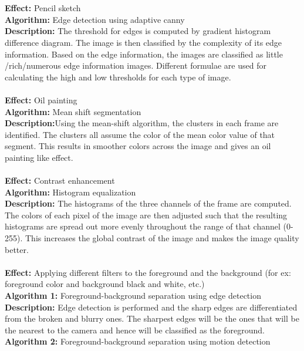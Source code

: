\documentclass{article}
\begin{document}
\\\\
{\bf{Effect:}} Pencil sketch \\
{\bf{Algorithm:}} Edge detection using adaptive canny\\	
{\bf{Description:}} The threshold for edges is computed by gradient histogram difference diagram. The image is then classified by the complexity of its edge information. Based on the edge information, the images are classified as little /rich/numerous edge information images. Different formulae are used for calculating the high and low thresholds for each type of image.\cite{7}\cite{9}\\\\  
{\bf{Effect:}} Oil painting\\
{\bf{Algorithm:}} Mean shift segmentation\\	
{\bf{Description:}}Using the mean-shift algorithm, the clusters in each frame are identified. The clusters all assume the color of the mean color value of that segment. This results in smoother colors across the image and gives an oil painting like effect.\cite{1}\cite{11}\\\\
{\bf{Effect:}} Contrast enhancement\\
{\bf{Algorithm:}} Histogram equalization\\	
{\bf{Description:}} The histograms of the three channels of the frame are computed. The colors of each pixel of the image are then adjusted such that the resulting histograms are spread out more evenly throughout the range of that channel (0-255). This increases the global contrast of the image and makes the image quality better.\cite{8}\\\\
{\bf{Effect:}} Applying different filters to the foreground and the background (for ex: foreground color and background black and white, etc.)\\
{\bf{Algorithm 1:}} Foreground-background separation using edge detection\\	
{\bf{Description:}} Edge detection is performed and the sharp edges are differentiated from the broken and blurry ones.  The sharpest edges will be the ones that will be the nearest to the camera and hence will be classified as the foreground.\cite{12}\\
{\bf{Algorithm 2:}} Foreground-background separation using motion detection\\	
\end{document}
